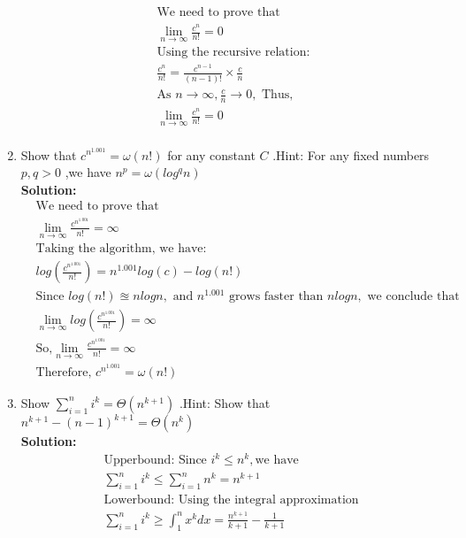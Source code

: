 \begin{enumerate}
    \begin{align*}
        &\text{We need to prove that }&\\
        &\lim_{n\rightarrow\infty}\frac{c^n}{n!}=0&\\
        &\text{Using the recursive relation:}&\\
        &\frac{c^n}{n!}=\frac{c^{n-1}}{(n-1)!}\times \frac{c}{n}&\\
        &\text{As }n\rightarrow\infty, \frac{c}{n}\rightarrow0,\text{ Thus, }&\\
        &\lim_{n\rightarrow\infty}\frac{c^n}{n!}=0&\\
    \end{align*}
    \item Show that $c^{n^{1.001}}=\omega(n!)$ for any constant $C$ .Hint: For any fixed numbers $p,q>0$ ,we have $n^{p}=\omega(log^{q}n)$
    \\\textbf{Solution:}
    \begin{align*}
        &\text{We need to prove that }&\\
        &\lim_{n\rightarrow\infty}\frac{c^{n^{1.001}}}{n!}=\infty&\\
        &\text{Taking the algorithm, we have:}&\\
        &log(\frac{c^{n^{1.001}}}{n!})=n^{1.001}log(c)-log(n!)&\\
        &\text{Since }log(n!)\approxeq nlogn,\text{ and }n^1.001 \text{ grows faster than }nlogn,\text{ we conclude that }&\\
        &\lim_{n\rightarrow\infty}log(\frac{c^{n^{1.001}}}{n!})=\infty&\\
        &\text{So,}\lim_{n\rightarrow\infty}\frac{c^{n^{1.001}}}{n!}=\infty&\\
        &\text{Therefore, }c^{n^{1.001}}=\omega(n!)&
    \end{align*}
    \item Show $\sum_{i=1}^ni^k=\Theta(n^{k+1})$ .Hint: Show that $n^{k+1}-(n-1)^{k+1}=\Theta(n^{k})$
    \\\textbf{Solution:}
    \begin{align*}
        &\text{Upperbound: Since }i^k\leq n^k,\text{we have}&\\
        &\sum_{i=1}^ni^k\leq \sum_{i=1}^nn^k=n^{k+1}&\\
        &\text{Lowerbound: Using the integral approximation }&\\
        &\sum_{i=1}^{n}i^k\geq \int_{1}^{n}x^kdx=\frac{n^{k+1}}{k+1}-\frac{1}{k+1}&\\

\end{align*}
\end{enumerate}
